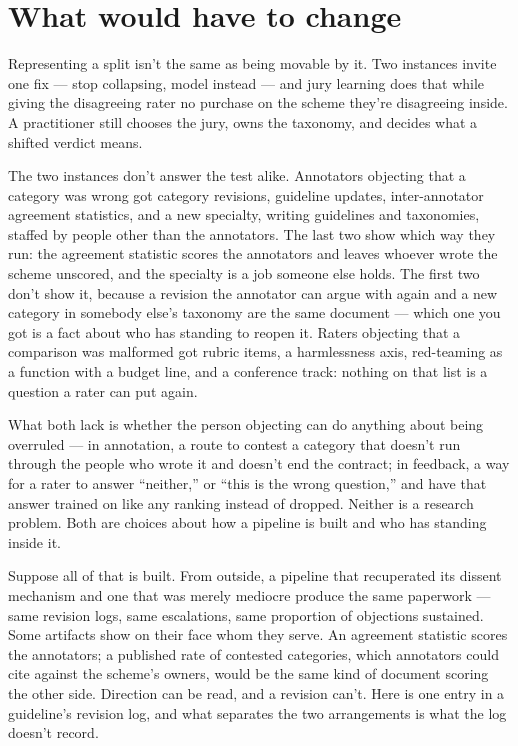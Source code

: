 \section{What would have to change}
\label{sec:23.6}
Representing a split isn't the same as being movable by it. Two instances invite one fix — stop collapsing, model instead — and jury learning does that while giving the disagreeing rater no purchase on the scheme they're disagreeing inside. A practitioner still chooses the jury, owns the taxonomy, and decides what a shifted verdict means.

The two instances don't answer the test alike. Annotators objecting that a category was wrong got category revisions, guideline updates, inter-annotator agreement statistics, and a new specialty, writing guidelines and taxonomies, staffed by people other than the annotators. The last two show which way they run: the agreement statistic scores the annotators and leaves whoever wrote the scheme unscored, and the specialty is a job someone else holds. The first two don't show it, because a revision the annotator can argue with again and a new category in somebody else's taxonomy are the same document — which one you got is a fact about who has standing to reopen it. Raters objecting that a comparison was malformed got rubric items, a harmlessness axis, red-teaming as a function with a budget line, and a conference track: nothing on that list is a question a rater can put again.


What both lack is whether the person objecting can do anything about being overruled — in annotation, a route to contest a category that doesn't run through the people who wrote it and doesn't end the contract; in feedback, a way for a rater to answer “neither,” or “this is the wrong question,” and have that answer trained on like any ranking instead of dropped. Neither is a research problem. Both are choices about how a pipeline is built and who has standing inside it.


Suppose all of that is built. From outside, a pipeline that recuperated its dissent mechanism and one that was merely mediocre produce the same paperwork — same revision logs, same escalations, same proportion of objections sustained. Some artifacts show on their face whom they serve. An agreement statistic scores the annotators; a published rate of contested categories, which annotators could cite against the scheme's owners, would be the same kind of document scoring the other side. Direction can be read, and a revision can't. Here is one entry in a guideline's revision log, and what separates the two arrangements is what the log doesn't record.

